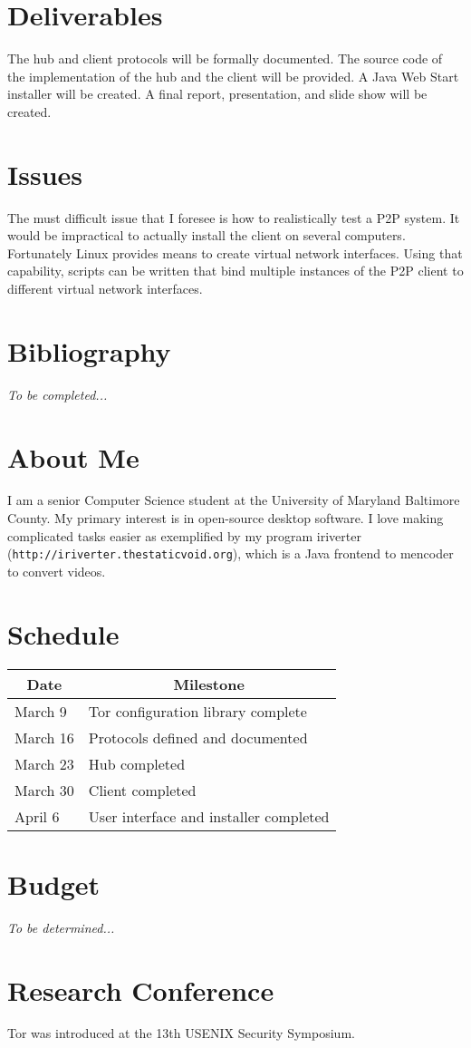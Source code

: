 \documentclass[12pt]{article}
\begin{document}
\section{Deliverables}
The hub and client protocols will be formally documented.  The source code of the implementation of the hub and the client will be provided.  A Java Web Start installer will be created.  A final report, presentation, and slide show will be created.

\section{Issues}
The must difficult issue that I foresee is how to realistically test a P2P system.  It would be impractical to actually install the client on several computers.  Fortunately Linux provides means to create virtual network interfaces.  Using that capability, scripts can be written that bind multiple instances of the P2P client to different virtual network interfaces.

\section{Bibliography}
\emph{To be completed...}

\section{About Me}
I am a senior Computer Science student at the University of Maryland Baltimore County.  My primary interest is in open-source desktop software.  I love making complicated tasks easier as exemplified by my program iriverter (\verb+http://iriverter.thestaticvoid.org+), which is a Java frontend to mencoder to convert videos.

\section{Schedule}
\begin{center}
\begin{tabular}{ll}
\multicolumn{1}{c}{\bf Date} & \multicolumn{1}{c}{\bf Milestone}\\
\hline
March 9 & Tor configuration library complete\\
March 16 & Protocols defined and documented\\
March 23 & Hub completed\\
March 30 & Client completed\\
April 6 & User interface and installer completed
\end{tabular}
\end{center}

\section{Budget}
\emph{To be determined...}

\appendix
\section{Research Conference}
Tor was introduced at the 13th USENIX Security Symposium.
\end{document}
